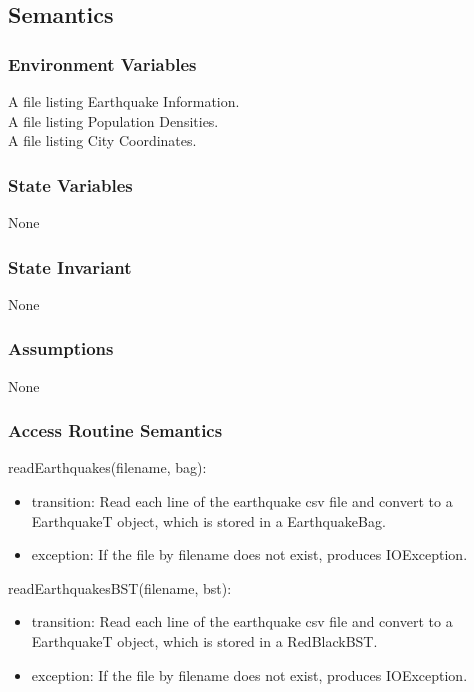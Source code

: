\documentclass[12pt]{article}
\begin{document}
\subsection* {Semantics}

\subsubsection* {Environment Variables}

A file listing Earthquake Information.\\
A file listing Population Densities.\\
A file listing City Coordinates.

\subsubsection* {State Variables}

None

\subsubsection* {State Invariant}

None

\subsubsection* {Assumptions}

None

\subsubsection* {Access Routine Semantics}

\noindent readEarthquakes(filename, bag):
\begin{itemize}
\item transition: Read each line of the earthquake csv file and convert to a EarthquakeT object, which is stored in a EarthquakeBag.
\item exception: If the file by filename does not exist, produces IOException.
\end{itemize}

\noindent readEarthquakesBST(filename, bst):
\begin{itemize}
\item transition: Read each line of the earthquake csv file and convert to a EarthquakeT object, which is stored in a RedBlackBST.
\item exception: If the file by filename does not exist, produces IOException.
\end{itemize}
\end{document}
